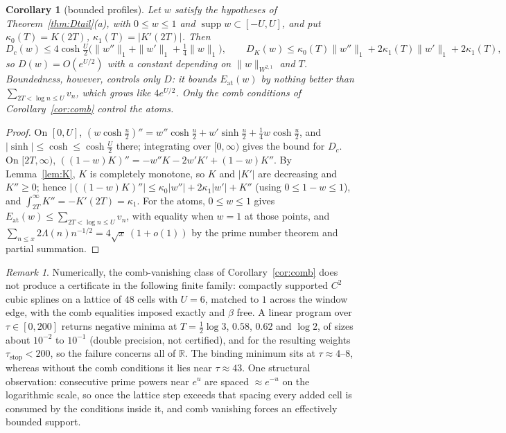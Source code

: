 \documentclass[11pt]{amsart}
\newtheorem{corollary}[theorem]{Corollary}
\theoremstyle{definition}
\theoremstyle{remark}
\newtheorem{remark}[theorem]{Remark}
\newcommand{\R}{\mathbb R}
\newcommand{\supp}{\operatorname{supp}}
\begin{document}
\begin{corollary}[bounded profiles]\label{cor:bprof}
Let $w$ satisfy the hypotheses of Theorem~\ref{thm:Dtail}(a), with $0\le w\le1$ and $\supp w\subset[-U,U]$,
and put $\kappa_0(T)=K(2T)$, $\kappa_1(T)=|K'(2T)|$. Then
\[
D_c(w)\le4\cosh\tfrac U2\Big(\|w''\|_1+\|w'\|_1+\tfrac14\|w\|_1\Big),\qquad
D_K(w)\le\kappa_0(T)\|w''\|_1+2\kappa_1(T)\|w'\|_1+2\kappa_1(T),
\]
so $D(w)=O(e^{U/2})$ with a constant depending on $\|w\|_{W^{2,1}}$ and $T$. Boundedness, however,
controls only $D$: it bounds $E_{\mathrm{at}}(w)$ by nothing better than $\sum_{2T<\log n\le U}v_n$, which
grows like $4e^{U/2}$. Only the comb conditions of Corollary~\ref{cor:comb} control the atoms.
\end{corollary}
\begin{proof}
On $[0,U]$, $(w\cosh\frac u2)''=w''\cosh\frac u2+w'\sinh\frac u2+\frac14w\cosh\frac u2$, and
$|\sinh|\le\cosh\le\cosh\frac U2$ there; integrating over $[0,\infty)$ gives the bound for $D_c$. On
$[2T,\infty)$, $((1-w)K)''=-w''K-2w'K'+(1-w)K''$. By Lemma~\ref{lem:K}, $K$ is completely monotone, so
$K$ and $|K'|$ are decreasing and $K''\ge0$; hence $|((1-w)K)''|\le\kappa_0|w''|+2\kappa_1|w'|+K''$
(using $0\le1-w\le1$), and $\int_{2T}^\infty K''=-K'(2T)=\kappa_1$. For the atoms, $0\le w\le1$ gives
$E_{\mathrm{at}}(w)\le\sum_{2T<\log n\le U}v_n$, with equality when $w=1$ at those points, and
$\sum_{n\le x}2\Lambda(n)n^{-1/2}=4\sqrt x\,(1+o(1))$ by the prime number theorem and partial summation.
\end{proof}

\begin{remark}\label{rem:comblp}
Numerically, the comb-vanishing class of Corollary~\ref{cor:comb} does not produce a certificate in the
following finite family: compactly supported $C^2$ cubic splines on a lattice of $48$ cells with $U=6$,
matched to $1$ across the window edge, with the comb equalities imposed exactly and $\beta$ free. A
linear program over $\tau\in[0,200]$ returns negative minima at $T=\frac12\log3$, $0.58$, $0.62$ and
$\log2$, of sizes about $10^{-2}$ to $10^{-1}$ (double precision, not certified), and for the
resulting weights $\tau_{\mathrm{stop}}<200$, so the failure concerns all of $\R$. The binding minimum
sits at $\tau\approx4$--$8$, whereas without the comb conditions it lies near $\tau\approx43$. One
structural observation: consecutive prime powers near $e^u$ are spaced $\approx e^{-u}$ on the
logarithmic scale, so once the lattice step exceeds that spacing every added cell is consumed by the
conditions inside it, and comb vanishing forces an effectively bounded support.
\end{remark}
\end{document}
